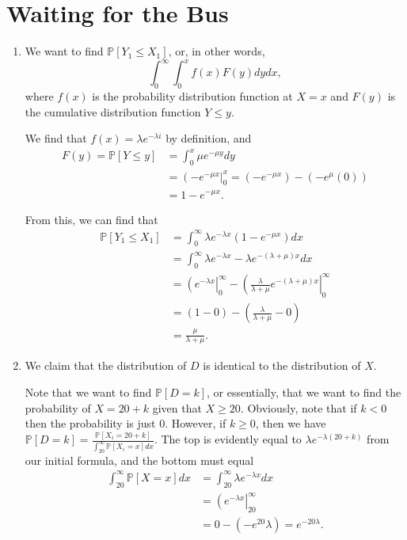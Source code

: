 \documentclass{article}
\newcommand{\p}{\mathbb{P}}
\begin{document}
\section{Waiting for the Bus}
\begin{enumerate}[label=(\alph*)]
\item We want to find $\p[Y_1 \leq X_1]$, or, in other words, 
\[\int_0^\infty \int_0^x f(x)F(y) dy dx,\]
where $f(x)$ is the probability distribution function at $X = x$ and $F(y)$ is the cumulative distribution function $Y \leq y$.

We find that $f(x) = \lambda e^{-\lambda i}$ by definition, and
\begin{align*}
F(y) = \p[Y \leq y] &= \int_0^x \mu e^{-\mu y} dy \\
&= \left(-e^{-\mu x} \right|_0^x = (-e^{-\mu x}) - (-e^\mu(0)) \\
&= 1 - e^{-\mu x}.
\end{align*}

From this, we can find that 
\begin{align*}
\p[Y_1 \leq X_1] &= \int_0^\infty \lambda e^{-\lambda x} (1-e^{-\mu x}) dx \\
&= \int_0^\infty \lambda e^{-\lambda x} - \lambda e^{-(\lambda + \mu)x} dx \\
&= \left( e^{-\lambda x} \right| _0^\infty - \left( \frac{\lambda}{\lambda + \mu} e^{-(\lambda + \mu)x} \right|_0^\infty \\
&= (1-0) - \left(\frac{\lambda}{\lambda + \mu}-0\right) \\
&= \boxed{\frac{\mu}{\lambda + \mu}}.
\end{align*}

\item We claim that the distribution of $D$ is identical to the distribution of $X$. 

Note that we want to find $\p[D = k]$, or essentially, that we want to find the probability of $X = 20+k$ given that $X \geq 20$. Obviously, note that if $k < 0$ then the probability is just $0$. However, if $k \geq 0$, then we have $\p[D = k] = \frac{\p[X_i = 20+k]}{\int_{20}^\infty \p[X_i = x] dx}$. The top is evidently equal to $\lambda e^{-\lambda (20+k)}$ from our initial formula, and the bottom must equal
\begin{align*}
\int_{20}^\infty \p[X = x] dx &= \int_{20}^\infty \lambda e^{-\lambda x} dx \\
&= \left(e^{-\lambda x} \right|_{20}^\infty \\
&= 0 - (-e^20\lambda) = e^{-20\lambda}.
\end{align*}


\end{enumerate}
\end{document}
